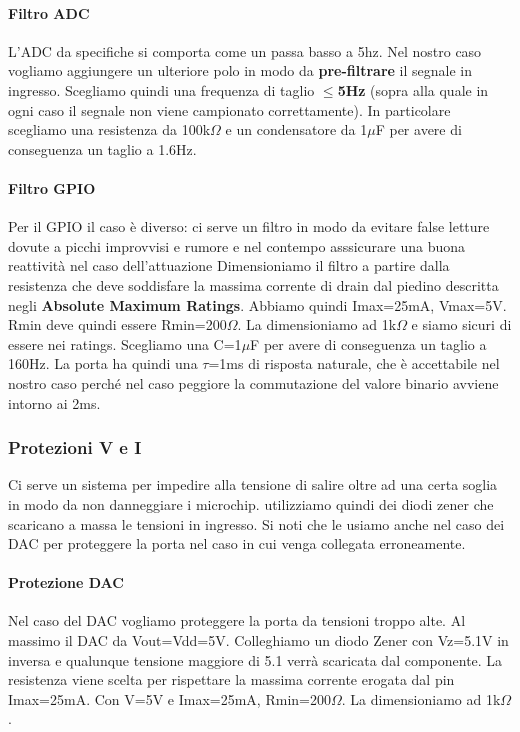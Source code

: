 \documentclass[10pt]{article}
\begin{document}
			\paragraph{Filtro ADC}
				L'ADC da specifiche si comporta come un passa basso a 5hz. Nel nostro caso vogliamo aggiungere un ulteriore polo in modo da \textbf{pre-filtrare} il segnale in ingresso.
				Scegliamo quindi una frequenza di taglio \textbf{\(\le\)5Hz} (sopra alla quale in ogni caso il segnale non viene campionato correttamente).
				In particolare scegliamo una resistenza da 100k\(\Omega\) e un condensatore da 1\(\mu\)F per avere di conseguenza un taglio a 1.6Hz.
			\paragraph{Filtro GPIO}
				Per il GPIO il caso è diverso: ci serve un filtro in modo da evitare false letture dovute a picchi improvvisi e rumore e nel contempo asssicurare una buona reattività nel caso dell'attuazione
				Dimensioniamo il filtro a partire dalla resistenza che deve soddisfare la massima corrente di drain dal piedino descritta negli \textbf{Absolute Maximum Ratings}.
				Abbiamo quindi Imax=25mA, Vmax=5V. Rmin deve quindi essere Rmin=200\(\Omega\). La dimensioniamo ad 1k\(\Omega\) e siamo sicuri di essere nei ratings.
				Scegliamo una C=1\(\mu\)F per avere di conseguenza un taglio a 160Hz. La porta ha quindi una \(\tau\)=1ms di risposta naturale, che è accettabile nel nostro caso perché nel caso peggiore la commutazione del valore binario avviene intorno ai 2ms.
		\subsubsection{Protezioni V e I}
		Ci serve un sistema per impedire alla tensione di salire oltre ad una certa soglia in modo da non danneggiare i microchip. utilizziamo quindi dei diodi zener che scaricano a massa le tensioni in ingresso.
		Si noti che le usiamo anche nel caso dei DAC per proteggere la porta nel caso in cui venga collegata erroneamente.
			\paragraph{Protezione DAC}
				Nel caso del DAC vogliamo proteggere la porta da tensioni troppo alte. Al massimo il DAC da Vout=Vdd=5V. Colleghiamo un diodo Zener con Vz=5.1V in inversa e qualunque tensione maggiore di 5.1 verrà scaricata dal componente.
				La resistenza viene scelta per rispettare la massima corrente erogata dal pin Imax=25mA. Con V=5V e Imax=25mA, Rmin=200\(\Omega\). La dimensioniamo ad 1k\(\Omega\).
\end{document}
